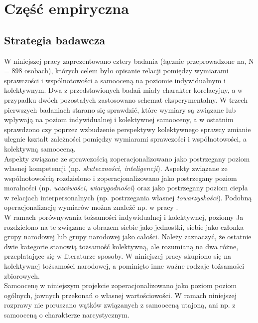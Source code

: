 \documentclass[man]{apa6}
\begin{document}
\newpage
\section{Część empiryczna}

\subsection{Strategia badawcza}

W niniejszej pracy zaprezentowano cztery badania (łącznie przeprowadzone na, N = 898 osobach), których celem było opisanie relacji pomiędzy wymiarami sprawczości i wspólnotowości a samooceną na poziomie indywidualnym i kolektywnym. Dwa z przedstawionych badań miały charakter korelacyjny, a w przypadku dwóch pozostałych zastosowano schemat eksperymentalny. W trzech pierwszych badaniach starano się sprawdzić, które wymiary są związane lub wpływają na poziom indywidualnej i kolektywnej samooceny, a w ostatnim sprawdzono czy poprzez wzbudzenie perspektywy kolektywnego sprawcy zmianie ulegnie kształt zależności pomiędzy wymiarami sprawczości i wspólnotowości, a kolektywną samooceną. \\

Aspekty związane ze sprawczością zoperacjonalizowano jako postrzegany poziom własnej kompetencji (np. \emph{skuteczności, inteligencji}). Aspekty związane ze wspólnotowością rozdzielono i zoperacjonalizowano jako postrzegany poziom moralności (np. \emph{uczciwości, wiarygodności}) oraz jako postrzegany poziom ciepła w relacjach interpersonalnych (np. postrzegania własnej \emph{towarzyskości}). Podobną operacjonalizację wymiarów można znaleźć np. w pracy \textcite{leach2007group}.\\

W ramach porównywania tożsamości indywidualnej i kolektywnej, poziomy Ja rozdzielono na te związane z obrazem siebie jako jednostki, siebie jako członka grupy narodowej lub grupy narodowej jako całości. Należy zaznaczyć, że ostatnie dwie kategorie stanowią tożsamość kolektywną, ale rozumianą na dwa różne, przeplatające się w literaturze sposoby. W niniejszej pracy skupiono się na kolektywnej tożsamości narodowej, a pominięto inne ważne rodzaje tożsamości zbiorowych.\\

Samoocenę w niniejszym projekcie zoperacjonalizowano jako poziom poziom ogólnych, jawnych przekonań o własnej wartościowości. W ramach niniejszej rozprawy nie poruszano wątków związanych z samooceną utajoną, ani np. z samooceną o charakterze narcystycznym.
\end{document}
